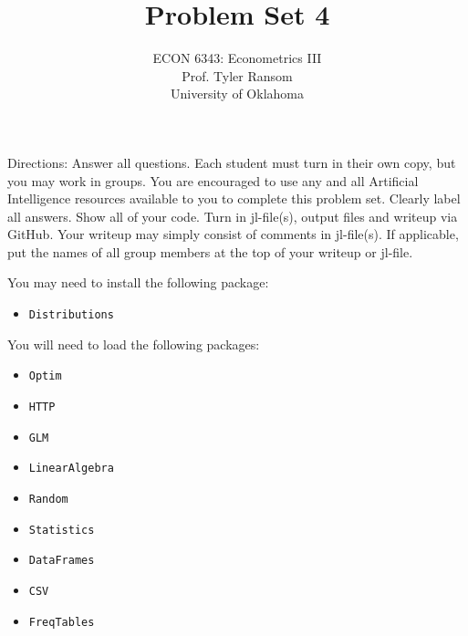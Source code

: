 \documentclass[12pt,english]{article}
\begin{document}
\title{Problem Set 4}
\author{ECON 6343: Econometrics III\\
Prof. Tyler Ransom\\
University of Oklahoma}
\date{}%

\maketitle
Directions: Answer all questions. Each student must turn in their own copy, but you may work in groups. You are encouraged to use any and all Artificial Intelligence resources available to you to complete this problem set. Clearly label all answers. Show all of your code. Turn in jl-file(s), output files and writeup via GitHub. Your writeup may simply consist of comments in jl-file(s). If applicable, put the names of all group members at the top of your writeup or jl-file.

You may need to install the following package:
\begin{itemize}
    \item[~] \texttt{Distributions}
\end{itemize}

You will need to load the following packages:
\begin{itemize}
    \item[~] \texttt{Optim} 
    \item[~] \texttt{HTTP} 
    \item[~] \texttt{GLM} 
    \item[~] \texttt{LinearAlgebra} 
    \item[~] \texttt{Random} 
    \item[~] \texttt{Statistics} 
    \item[~] \texttt{DataFrames} 
    \item[~] \texttt{CSV} 
    \item[~] \texttt{FreqTables}
\end{itemize}
\end{document}
